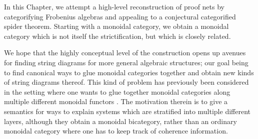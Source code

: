 %
%
%
%
%
%
%
%
%
%
%
%
%
%
%
%
%
%
%
%
%
%
%
%
%
%
%
%
%
%
%
%
%
%
%
%
%
%
%
%
%
%
%
%
%
%
%
%
%
%
%
%
%
%
%
%
%
%
%
%
%
%
%
%
%

In this Chapter, we attempt a high-level reconstruction of  proof nets by categorifying Frobenius algebras and appealing to a conjectural categorified spider theorem.  Starting with a monoidal category, we obtain a monoidal category which is not itself the strictification, but which is closely related.

We  hope that the highly conceptual level of the construction opens up avenues for finding string diagrams for more general algebraic structures; our goal being to find canonical ways to glue monoidal categories together and obtain new kinds of string diagrams thereof.  This kind of problem has previously been considered in the setting where one wants to glue together monoidal categories along multiple different monoidal functors \cite{lobski}.  The motivation therein is to give a semantics for ways to explain systems which are stratified into multiple different layers, although they obtain a monoidal bicategory, rather than an ordinary monoidal category where one has to keep track of coherence information.



